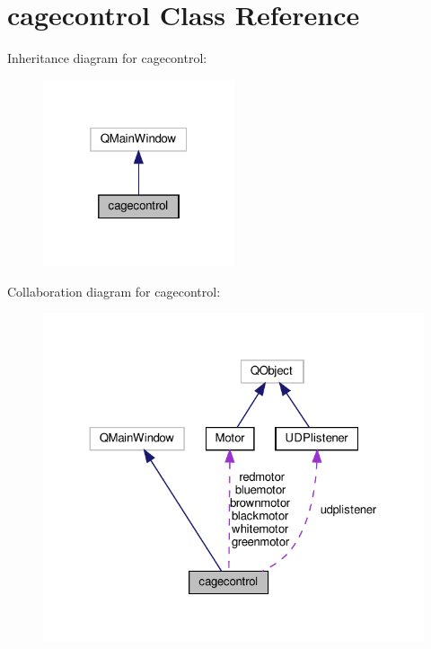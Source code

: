 \hypertarget{classcagecontrol}{}\section{cagecontrol Class Reference}
\label{classcagecontrol}


Inheritance diagram for cagecontrol\+:\nopagebreak
\begin{figure}[H]
\begin{center}
\leavevmode
\includegraphics[width=160pt]{classcagecontrol__inherit__graph}
\end{center}
\end{figure}


Collaboration diagram for cagecontrol\+:
\nopagebreak
\begin{figure}[H]
\begin{center}
\leavevmode
\includegraphics[width=324pt]{classcagecontrol__coll__graph}
\end{center}
\end{figure}
